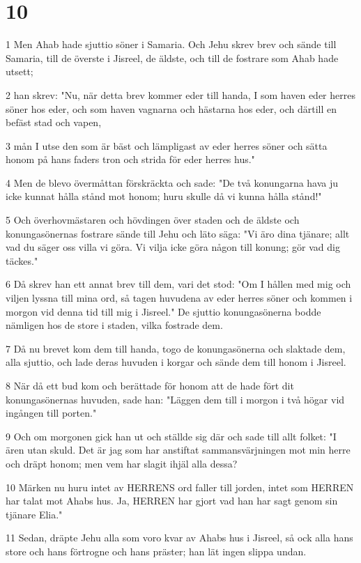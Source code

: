 \chapter{10}

\par 1 Men Ahab hade sjuttio söner i Samaria. Och Jehu skrev brev och sände till Samaria, till de överste i Jisreel, de äldste, och till de fostrare som Ahab hade utsett;
\par 2 han skrev: "Nu, när detta brev kommer eder till handa, I som haven eder herres söner hos eder, och som haven vagnarna och hästarna hos eder, och därtill en befäst stad och vapen,
\par 3 mån I utse den som är bäst och lämpligast av eder herres söner och sätta honom på hans faders tron och strida för eder herres hus."
\par 4 Men de blevo övermåttan förskräckta och sade: "De två konungarna hava ju icke kunnat hålla stånd mot honom; huru skulle då vi kunna hålla stånd!"
\par 5 Och överhovmästaren och hövdingen över staden och de äldste och konungasönernas fostrare sände till Jehu och läto säga: "Vi äro dina tjänare; allt vad du säger oss villa vi göra. Vi vilja icke göra någon till konung; gör vad dig täckes."
\par 6 Då skrev han ett annat brev till dem, vari det stod: "Om I hållen med mig och viljen lyssna till mina ord, så tagen huvudena av eder herres söner och kommen i morgon vid denna tid till mig i Jisreel." De sjuttio konungasönerna bodde nämligen hos de store i staden, vilka fostrade dem.
\par 7 Då nu brevet kom dem till handa, togo de konungasönerna och slaktade dem, alla sjuttio, och lade deras huvuden i korgar och sände dem till honom i Jisreel.
\par 8 När då ett bud kom och berättade för honom att de hade fört dit konungasönernas huvuden, sade han: "Läggen dem till i morgon i två högar vid ingången till porten."
\par 9 Och om morgonen gick han ut och ställde sig där och sade till allt folket: "I ären utan skuld. Det är jag som har anstiftat sammansvärjningen mot min herre och dräpt honom; men vem har slagit ihjäl alla dessa?
\par 10 Märken nu huru intet av HERRENS ord faller till jorden, intet som HERREN har talat mot Ahabs hus. Ja, HERREN har gjort vad han har sagt genom sin tjänare Elia."
\par 11 Sedan, dräpte Jehu alla som voro kvar av Ahabs hus i Jisreel, så ock alla hans store och hans förtrogne och hans präster; han lät ingen slippa undan.
